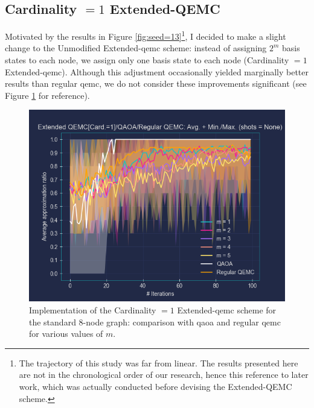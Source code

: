 \protect\subsection{Cardinality \texorpdfstring{$= 1$}{= 1} Extended-QEMC}
\label{subsection:Card._eq_1_Extended_QEMC}

Motivated by the results in Figure \ref{fig:seed=13}\footnote{The trajectory of this study was far from linear. The results presented here are not in the chronological order of our research, hence this reference to later work, which was actually conducted before devising the Extended-QEMC scheme.}, I decided to make a slight change to the Unmodified Extended-\acrshort{qemc} scheme: instead of assigning $2^m$ basis states to each node, we assign only one basis state to each node (Cardinality $= 1$ Extended-\acrshort{qemc}). Although this adjustment occasionally yielded marginally better results than regular \acrshort{qemc}, we do not consider these improvements significant (see Figure \ref{fig:Card.=1_Extended-QEMC} for reference).
\begin{figure}[h]
    \centering
    \includegraphics[width=1\textwidth]{Figures/Chapter_5/Extended-QEMC/8-node[Card.=1](n_layers=3, step_size=0.95, m=All).png}
    \caption{Implementation of the Cardinality $= 1$ Extended-\acrshort{qemc} scheme for the standard $8$-node graph: comparison with \acrshort{qaoa} and regular \acrshort{qemc} for various values of $m$.}
    \label{fig:Card.=1_Extended-QEMC}
\end{figure}

